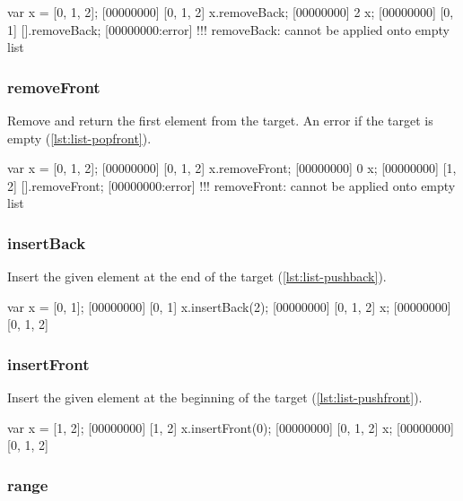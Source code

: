 \begin{urbiscript}[caption=List.removeBack, label=lst:list-popback]
var x = [0, 1, 2];
[00000000] [0, 1, 2]
x.removeBack;
[00000000] 2
x;
[00000000] [0, 1]
[].removeBack;
[00000000:error] !!! removeBack: cannot be applied onto empty list
\end{urbiscript}

\subsubsection{removeFront}

Remove and return the first element from the target. An error if the
target is empty (\autoref{lst:list-popfront}).

\begin{urbiscript}[caption=List.removeFront, label=lst:list-popfront]
var x = [0, 1, 2];
[00000000] [0, 1, 2]
x.removeFront;
[00000000] 0
x;
[00000000] [1, 2]
[].removeFront;
[00000000:error] !!! removeFront: cannot be applied onto empty list
\end{urbiscript}

\subsubsection{insertBack}
\label{sec:std-list-pushback}

Insert the given element at the end of the target
(\autoref{lst:list-pushback}).

\begin{urbiscript}[caption=List.insertBack, label=lst:list-pushback]
var x = [0, 1];
[00000000] [0, 1]
x.insertBack(2);
[00000000] [0, 1, 2]
x;
[00000000] [0, 1, 2]
\end{urbiscript}

\subsubsection{insertFront}

Insert the given element at the beginning of the target
(\autoref{lst:list-pushfront}).

\begin{urbiscript}[caption=List.insertFront, label=lst:list-pushfront]
var x = [1, 2];
[00000000] [1, 2]
x.insertFront(0);
[00000000] [0, 1, 2]
x;
[00000000] [0, 1, 2]
\end{urbiscript}

\subsubsection{range}

